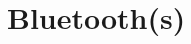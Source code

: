 \section{Bluetooth(s)}

\begin{frame}
\end{frame}

\begin{frame}
\end{frame}

\begin{frame}
\end{frame}


